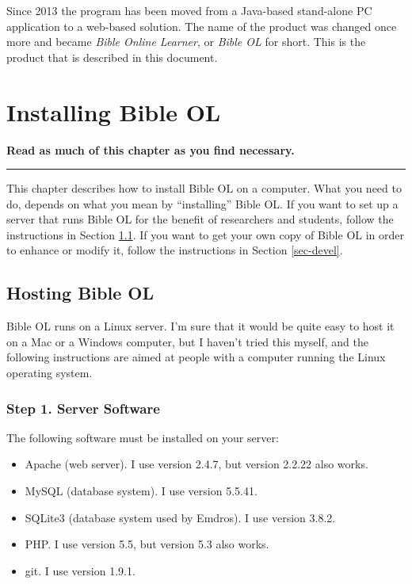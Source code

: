 \documentclass[11pt,oneside,a4paper]{memoir}
\begin{document}
Since 2013 the program has been moved from a Java-based stand-alone PC application to a web-based
solution. The name of the product was changed once more and became \emph{Bible Online Learner},
or \emph{Bible OL} for short. This is the product that is described in this document.



\chapter{Installing Bible OL}\label{chap-install}

\textbf{Read as much of this chapter as you find necessary.}
\plainbreak{3}

This chapter describes how to install Bible OL on a computer. What you need to do, depends on what
you mean by ``installing'' Bible OL. If you want to set up a server that runs Bible OL for the
benefit of researchers and students, follow the instructions in Section \ref{sec-host}.
If you want to get your own copy of Bible OL in order to enhance or modify it, follow the
instructions in Section \ref{sec-devel}.


\section{Hosting Bible OL}\label{sec-host}

Bible OL runs on a Linux server. I'm sure that it would be quite easy to host it on a
Mac or a Windows computer, but I haven't tried this myself, and the
following instructions are aimed at people with a computer running the Linux operating system.

\subsection{Step 1. Server Software}

The following software must be installed on your server:

\begin{itemize}
\item Apache (web server). I use version 2.4.7, but version 2.2.22 also works.
\item MySQL (database system). I use version 5.5.41.
\item SQLite3 (database system used by Emdros). I use version 3.8.2.
\item PHP. I use version 5.5, but version 5.3 also works.
\item git. I use version 1.9.1.
\end{itemize}
\end{document}
